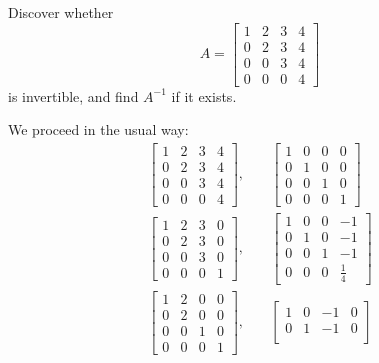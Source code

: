  Discover whether
\begin{equation*}
  A =
  \begin{bmatrix}
    1 & 2 & 3 & 4 \\
    0 & 2 & 3 & 4 \\
    0 & 0 & 3 & 4 \\
    0 & 0 & 0 & 4
  \end{bmatrix}
\end{equation*}
is invertible, and find $A^{-1}$ if it exists.
\begin{solution}
  We proceed in the usual way:
  \begin{align*}
    \begin{bmatrix}
      1 & 2 & 3 & 4 \\
      0 & 2 & 3 & 4 \\
      0 & 0 & 3 & 4 \\
      0 & 0 & 0 & 4
    \end{bmatrix},
    &\quad
    \begin{bmatrix}
      1 & 0 & 0 & 0 \\
      0 & 1 & 0 & 0 \\
      0 & 0 & 1 & 0 \\
      0 & 0 & 0 & 1
    \end{bmatrix} \\
    \begin{bmatrix}
      1 & 2 & 3 & 0 \\[3pt]
      0 & 2 & 3 & 0 \\[3pt]
      0 & 0 & 3 & 0 \\[3pt]
      0 & 0 & 0 & 1
    \end{bmatrix},
    &\quad
    \begin{bmatrix}
      1 & 0 & 0 & -1 \\[3pt]
      0 & 1 & 0 & -1 \\[3pt]
      0 & 0 & 1 & -1 \\[3pt]
      0 & 0 & 0 & \frac14
    \end{bmatrix} \\
    \begin{bmatrix}
      1 & 2 & 0 & 0 \\[3pt]
      0 & 2 & 0 & 0 \\[3pt]
      0 & 0 & 1 & 0 \\[3pt]
      0 & 0 & 0 & 1
    \end{bmatrix},
    &\quad
    \begin{bmatrix}
      1 & 0 & -1 & 0 \\[3pt]
      0 & 1 & -1 & 0 \\[3pt]

\end{bmatrix}
\end{align*}
\end{solution}
